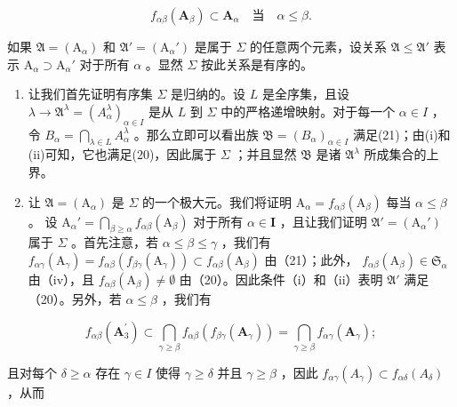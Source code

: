 \[
f _ {\alpha \beta} (\mathbf {A} _ {\beta}) \subset \mathbf {A} _ {\alpha} \quad \text{当} \quad \alpha \leqslant \beta .
\]

如果 \(\mathfrak{A} = (\mathrm{A}_{\alpha})\) 和 \(\mathfrak{A}' = (\mathrm{A}_{\alpha}')\) 是属于 \(\Sigma\) 的任意两个元素，设关系 \(\mathfrak{A} \leqslant \mathfrak{A}'\) 表示 \(\mathrm{A}_{\alpha} \supset \mathrm{A}_{\alpha}'\) 对于所有 \(\alpha\) 。显然 \(\Sigma\) 按此关系是有序的。

\begin{enumerate}
\def\labelenumi{(\arabic{enumi})}
\item
  让我们首先证明有序集 \(\Sigma\) 是归纳的。设 \(L\) 是全序集，且设 \(\lambda \to \mathfrak{A}^{\lambda} = (A_{\alpha}^{\lambda})_{\alpha \in I}\) 是从 \(L\) 到 \(\Sigma\) 中的严格递增映射。对于每一个 \(\alpha \in I\) ，令 \(B_{\alpha} = \bigcap_{\lambda \in L} A_{\alpha}^{\lambda}\) 。那么立即可以看出族 \(\mathfrak{B} = (B_{\alpha})_{\alpha \in I}\) 满足(21)；由(i)和(ii)可知，它也满足(20)，因此属于 \(\Sigma\) ；并且显然 \(\mathfrak{B}\) 是诸 \(\mathfrak{A}^{\lambda}\) 所成集合的上界。
\item
  让 \(\mathfrak{A} = (\mathrm{A}_{\alpha})\) 是 \(\Sigma\) 的一个极大元。我们将证明 \(\mathrm{A}_{\alpha} = f_{\alpha \beta}(\mathrm{A}_{\beta})\) 每当 \(\alpha \leqslant \beta\) 。 设 \(\mathrm{A}_{\alpha}' = \bigcap_{\beta \geqslant \alpha} f_{\alpha \beta}(\mathrm{A}_{\beta})\) 对于所有 \(\alpha \in \mathbf{I}\) ，且让我们证明 \(\mathfrak{A}' = (\mathrm{A}_{\alpha}')\) 属于 \(\Sigma\) 。首先注意，若 \(\alpha \leqslant \beta \leqslant \gamma\) ，我们有 \(f_{\alpha \gamma}(\mathrm{A}_{\gamma}) = f_{\alpha \beta}(f_{\beta \gamma}(\mathrm{A}_{\gamma})) \subset f_{\alpha \beta}(\mathrm{A}_{\beta})\) 由（21）；此外， \(f_{\alpha \beta}(\mathrm{A}_{\beta}) \in \mathfrak{S}_{\alpha}\) 由（iv），且 \(f_{\alpha \beta}(\mathrm{A}_{\beta}) \neq \emptyset\) 由（20）。因此条件（i）和（ii）表明 \(\mathfrak{A}'\) 满足（20）。另外，若 \(\alpha \leqslant \beta\) ，我们有
\end{enumerate}

\[
f _ {\alpha \beta} (\mathbf {A} _ {3} ^ {\prime}) \subset \bigcap_ {\gamma \geqslant \beta} f _ {\alpha \beta} (f _ {\beta \gamma} (\mathbf {A} _ {\gamma})) = \bigcap_ {\gamma \geqslant \beta} f _ {\alpha \gamma} (\mathbf {A} _ {\gamma});
\]

且对每个 \(\delta \geqslant \alpha\) 存在 \(\gamma \in I\) 使得 \(\gamma \geqslant \delta\) 并且 \(\gamma \geqslant \beta\) ，因此 \(f_{\alpha \gamma}(A_{\gamma}) \subset f_{\alpha \delta}(A_{\delta})\) ，从而

